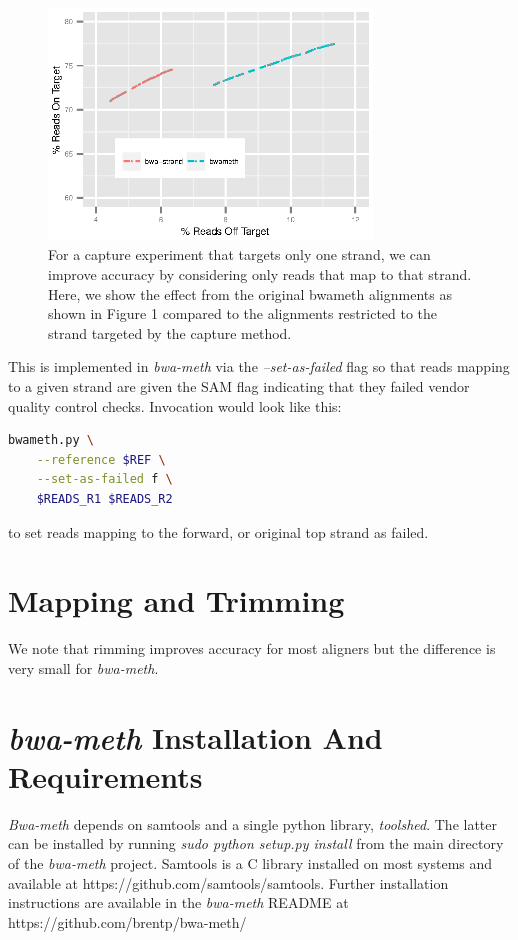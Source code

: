 \documentclass[12pt]{article}
\begin{document}
\begin{figure}[H]%
    \centerline{\includegraphics[width=86mm]{real-bwa-strand.eps}}
    \caption{For a capture experiment that targets only one strand, we can
    improve accuracy by considering only reads that map to that strand.
    Here, we show the effect from the original bwameth alignments as shown
    in Figure 1 compared to the alignments restricted to the strand targeted
    by the capture method.}\label{suppfig:07}
\end{figure}

This is implemented in \textit{bwa-meth} via the \emph{--set-as-failed}
flag so that reads mapping to a given strand are given the SAM flag
indicating that they failed vendor quality control checks. Invocation
would look like this:

\begin{lstlisting}[language=bash]
bwameth.py \
    --reference $REF \
    --set-as-failed f \
    $READS_R1 $READS_R2

\end{lstlisting}
to set reads mapping to the forward, or original top strand
as failed.


\section{Mapping and Trimming}
We note that rimming improves accuracy for most aligners but the
difference is very small for \textit{bwa-meth}.

\section{\textit{bwa-meth} Installation And Requirements}

\textit{Bwa-meth} depends on samtools and a single python library, \textit{toolshed}.
The latter can be installed by running \emph{sudo python setup.py install} from the main
directory of the \textit{bwa-meth} project. Samtools is a C library installed on most
systems and available at https://github.com/samtools/samtools.
Further installation instructions are available in the \textit{bwa-meth} README at
https://github.com/brentp/bwa-meth/
\end{document}
